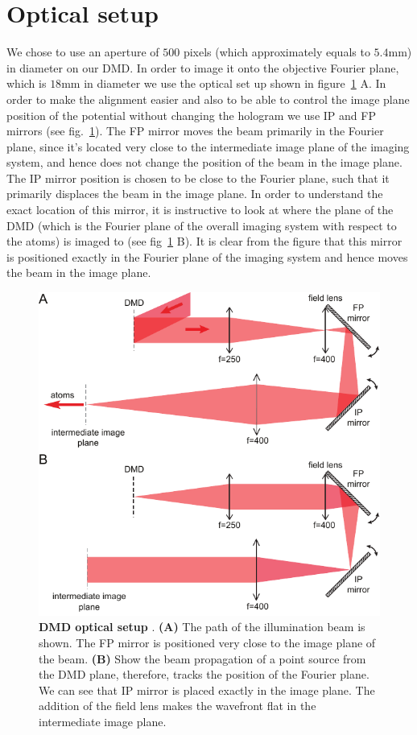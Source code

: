 \section{Optical setup}
We chose to use an aperture of $500$ pixels (which approximately equals to $5.4 \mathrm{mm}$) in diameter on our DMD. In order to image it onto the objective Fourier plane, which is $18 \mathrm{mm}$ in diameter we use the optical set up shown in figure~\ref{fig:DMD_setup} A. In order to make the alignment easier and also to be able to control the image plane position of the potential without changing the hologram we use IP and FP mirrors (see fig.~\ref{fig:DMD_setup}). The FP mirror moves the beam primarily in the Fourier plane, since it's located very close to the intermediate image plane of the imaging system, and hence does not change the position of the beam in the image plane. The IP mirror position is chosen to be close to the Fourier plane, such that it primarily displaces the beam in the image plane. In order to understand the exact location of this mirror, it is instructive to look at where the plane of the DMD (which is the Fourier plane of the overall imaging system with respect to the atoms) is imaged to (see fig~\ref{fig:DMD_setup} B). It is clear from the figure that this mirror is positioned exactly in the Fourier plane of the imaging system and hence moves the beam in the image plane.

\begin{figure}[t]
	\centering
	\includegraphics[scale=1]{figures/DMD_setup.pdf}
	\caption{{\bf DMD optical setup }. {\bf (A)} The path of the illumination beam is shown. The FP mirror is positioned very close to the image plane of the beam. {\bf (B)} Show the beam propagation of a point source from the DMD plane, therefore, tracks the position of the Fourier plane. We can see that IP mirror is placed exactly in the image plane. The addition of the field lens makes the wavefront flat in the intermediate image plane.}
	\label{fig:DMD_setup}
\end{figure}

